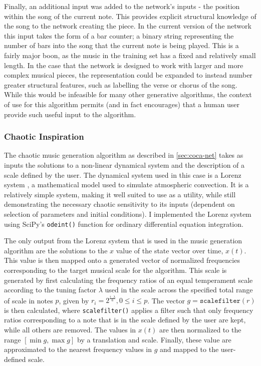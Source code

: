 \documentclass[ author={Stephen Livermore-Tozer},
				supervisor={Dr. Peter Flach},
				degree={MEng},
				title={Algorithmic Co-composition Using Machine Learning},
				subtitle={},
				type={research},
				year={2016} ]{dissertation}
\begin{document}
	Finally, an additional input was added to the network's inputs - the position within the song of the current note. This provides explicit structural knowledge of the song to the network creating the piece. In the current version of the network this input takes the form of a bar counter; a binary string representing the number of bars into the song that the current note is being played. This is a fairly major boon, as the music in the training set has a fixed and relatively small length. In the case that the network is designed to work with larger and more complex musical pieces, the representation could be expanded to instead number greater structural features, such as labelling the verse or chorus of the song. While this would be infeasible for many other generative algorithms, the context of use for this algorithm permits (and in fact encourages) that a human user provide such useful input to the algorithm.

	\subsubsection{Chaotic Inspiration}
	
	The chaotic music generation algorithm as described in \ref{sec:coca-net} takes as inputs the solutions to a non-linear dynamical system and the description of a scale defined by the user. The dynamical system used in this case is a Lorenz system \cite{lorenz1963deterministic}, a mathematical model used to simulate atmospheric convection. It is a relatively simple system, making it well suited to use as a utility, while still demonstrating the necessary chaotic sensitivity to its inputs (dependent on selection of parameters and initial conditions). I implemented the Lorenz system using SciPy's \texttt{odeint()} function for ordinary differential equation integration.
	
	The only output from the Lorenz system that is used in the music generation algorithm are the solutions to the $x$ value of the state vector over time, $x(t)$. This value is then mapped onto a generated vector of normalized frequencies corresponding to the target musical scale for the algorithm. This scale is generated by first calculating the frequency ratios of an equal temperament scale according to the tuning factor $\lambda$ used in the scale across the specified total range of scale in notes $p$, given by $r_i = 2^{\frac{i \cdot \lambda}{6}}, 0 \leq i \leq p$. The vector $g = \mathtt{scalefilter}(r)$ is then calculated, where \texttt{scalefilter()} applies a filter such that only frequency ratios corresponding to a note that is in the scale defined by the user are kept, while all others are removed. The values in $x(t)$ are then normalized to the range $[\min g, \max g]$ by a translation and scale. Finally, these value are approximated to the nearest frequency values in $g$ and mapped to the user-defined scale.
	
\end{document}
